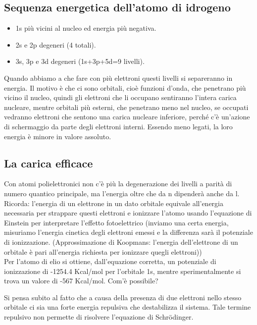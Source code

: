 \subsection{Sequenza energetica dell'atomo di idrogeno}
\begin{itemize}
  \item 1s più vicini al nucleo ed energia più negativa.
  \item 2s e 2p degeneri (4 totali).
  \item 3s, 3p e 3d degeneri (1s+3p+5d=9 livelli).
\end{itemize}
Quando abbiamo a che fare con più elettroni questi livelli si separeranno in energia. Il motivo è che ci sono orbitali, cioè funzioni d'onda, che penetrano più vicino il nucleo, quindi gli elettroni che li occupano sentiranno l'intera carica nucleare, mentre orbitali più esterni, che penetrano meno nel nucleo, se occupati vedranno elettroni che sentono una carica nucleare inferiore, perché c'è un'azione di schermaggio da parte degli elettroni interni. Essendo meno legati, la loro energia è minore in valore assoluto.
\subsection{La carica efficace}
Con atomi polielettronici non c'è più la degenerazione dei livelli a parità di numero quantico principale, ma l'energia oltre che da n dipenderà anche da l.\\

Ricorda: l'energia di un elettrone in un dato orbitale  equivale all'energia necessaria per strappare questi elettroni e ionizzare l'atomo usando l'equazione di Einstein per interpretare l'effetto fotoelettrico (inviamo una certa energia, misuriamo l'energia cinetica degli elettroni emessi e la differenza sarà il potenziale di ionizzazione. (Approssimazione di Koopmans: l'energia dell'elettrone di un orbitale è pari all'energia richiesta per ionizzare quegli elettroni))\\

Per l'atomo di elio si ottiene, dall'equazione corretta, un potenziale di ionizzazione di -1254.4 Kcal/mol per l'orbitale 1s, mentre sperimentalmente si trova un valore di -567 Kcal/mol. Com'è possibile?

Si pensa subito al fatto che a causa della presenza di due elettroni nello stesso orbitale ci sia una forte energia repulsiva che destabilizza il sistema. Tale termine repulsivo non permette di risolvere l'equazione di Schrödinger.

